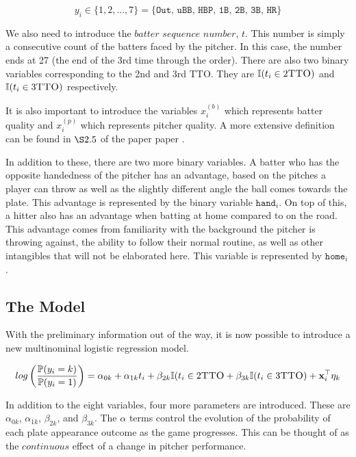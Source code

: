 \documentclass[a4paper,12pt]{article}
\begin{document}
$$ y_i \in \lbrace 1,2,...,7 \rbrace = \lbrace \texttt{Out, uBB, HBP, 1B, 2B, 3B, HR} \rbrace $$

We also need to introduce the$\textit{ batter sequence number}$, $t$.  This number is simply a consecutive count of the batters faced by the pitcher. In this case, the number ends at 27 (the end of the 3rd time through the order). There are also two binary variables corresponding to the 2nd and 3rd TTO. They are $ \mathbb{I} (t_i \in 2\textsc{TTO})$ and $\mathbb{I} (t_i \in 3\textsc{TTO})$ respectively.

It is also important to introduce the variables $x_i ^{(b)}$ which represents batter quality and $x_i ^{(p)}$ which represents pitcher quality. A more extensive definition can be found in $\S 2.5$ of the paper paper \cite{Brill_2023}. 

In addition to these, there are two more binary variables. A batter who has the opposite handedness of the pitcher has an advantage, based on the pitches a player can throw as well as the slightly different angle the ball comes towards the plate. This advantage is represented by the binary variable $\texttt{hand}_i$. On top of this, a hitter also has an advantage when batting at home compared to on the road. This advantage comes from familiarity with the background the pitcher is throwing against, the ability to follow their normal routine, as well as other intangibles that will not be elaborated here. This variable is represented by $\texttt{home}_i$.

\subsection{The Model}

With the preliminary information out of the way, it is now possible to introduce a new multinominal logistic regression model.

$$ log \left( \frac{\mathbb{P}(y_i = k)}{\mathbb{P}(y_i = 1)} \right) = \alpha_{0k}+\alpha_{1k}t_i + \beta_{2k} \mathbb{I}(t_i \in 2\textsc{TTO} + \beta_{3k} \mathbb{I}(t_i \in 3 \textsc{TTO}) + \textbf{x}_i^{\top} \eta_k $$

In addition to the eight variables, four more parameters are introduced. These are $\alpha_{0k}$, $\alpha_{1k}$, $\beta_{2k}$, and $\beta_{3k}$. The $\alpha$ terms control the evolution of the probability of each plate appearance outcome as the game progresses. This can be thought of as the $continuous$ effect of a change in pitcher performance.
\end{document}
